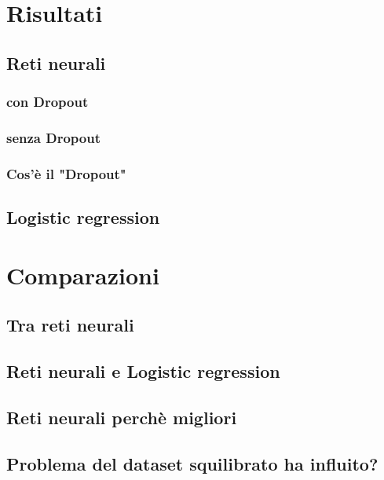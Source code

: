 \section{Risultati}
\subsection{Reti neurali}
\subsubsection{con Dropout}
\subsubsection{senza Dropout}
\subsubsection{Cos'è il "Dropout"}
\subsection{Logistic regression}
\section{Comparazioni}
\subsection{Tra reti neurali}
\subsection{Reti neurali e Logistic regression}
\subsection{Reti neurali perchè migliori}
\subsection{Problema del dataset squilibrato ha influito?}
